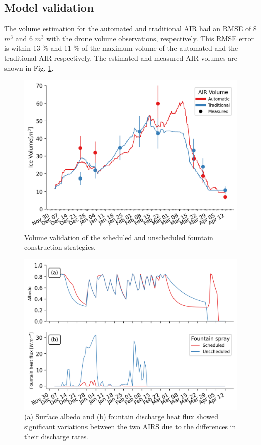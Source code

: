 \documentclass[tc, manuscript]{copernicus}
\begin{document}
\subsection{Model validation}

The volume estimation for the automated and traditional AIR had an RMSE of 8 $m^3$ and 6 $m^3$ with the drone
volume observations, respectively. This RMSE error is within 13 \% and 11 \% of the maximum volume of the
automated and the traditional AIR respectively. The estimated and measured AIR volumes are shown in Fig.
\ref{fig:validation}.  

\begin{figure}[t] \includegraphics[width=12cm] {Figures/validation.png} \caption{Volume validation of the
scheduled and unscheduled fountain construction strategies.} \label{fig:validation} \end{figure}

\begin{figure}[t]
\includegraphics[width=12cm]{Figures/dis_processes.png}
\caption{(a) Surface albedo  and (b) fountain discharge heat flux showed significant variations between the two
  AIRS due to the differences in their discharge rates.}
\label{fig:dis_processes}
\end{figure}
\end{document}
